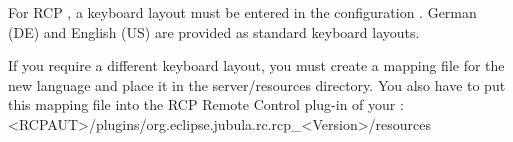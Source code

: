 
For RCP \gdauts{}, a keyboard layout must be entered in the \gdaut{} configuration . German (DE) and English (US) are provided as standard keyboard layouts. 

If you require a different keyboard layout, you must create a mapping file for the new language  and place it in the server/resources directory. You also have to put this mapping file into the RCP Remote Control plug-in of your \gdaut{}:\\


<RCPAUT>/plugins/org.eclipse.jubula.rc.rcp\_<Version>/resources


